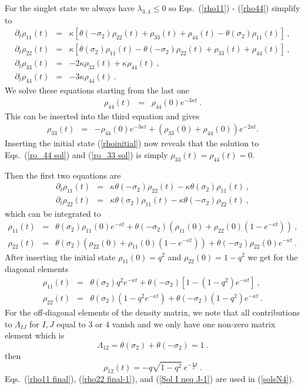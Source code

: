 \documentclass[12pt]{article}
\def\beqn{\begin{eqnarray}}
\def\eeqn{\end{eqnarray}}
\begin{document}
For the singlet state we always have $\lambda_{3,4}\le0$
so Eqs.\ (\ref{rho11}) - (\ref{rho44}) simplify to
\beqn
\partial_{t}\rho_{11}(t) &=&\kappa\left[\theta(-\sigma_{2})\rho_{22}(t)+\rho_{33}(t)+\rho_{44}(t)-\theta(\sigma_{2})\rho_{11}(t)\right]~, \\
\partial_{t}\rho_{22}(t) &=&\kappa\left[\theta(\sigma_{2})\rho_{11}(t)-\theta(-\sigma_{2})\rho_{22}(t)+\rho_{33}(t)+\rho_{44}(t)\right]~,\\
\partial_{t}\rho_{33}(t) &=& -2\kappa\rho_{33}(t)+\kappa\rho_{44}(t)~,\\
\partial_{t}\rho_{44}(t) &=& -3\kappa\rho_{44}(t)~.
\eeqn
We solve these equations starting from the last one 
\beqn
\rho_{44}(t) &=& \rho_{44}(0)e^{-3\kappa t}\label{ro_44 sol}~.
\eeqn
This can be inserted into the third equation and gives
\beqn
\rho_{33}(t) &=& -\rho_{44}(0)e^{-3\kappa t}+\left(\rho_{33}(0)+\rho_{44}(0)\right)e^{-2\kappa t}.\label{ro_33 sol}
\eeqn
Inserting the initial state (\ref{rhoinitial}) now reveals that the solution to Eqs.\ (\ref{ro_44 sol})
and (\ref{ro_33 sol}) is simply $\rho_{33}(t)=\rho_{44}(t)=0$.

Then the first two equations are
\beqn
\partial_{t}\rho_{11}(t) &=&\kappa\theta(-\sigma_{2})\rho_{22}(t)-\kappa\theta(\sigma_{2})\rho_{11}(t)~,\\
\partial_{t}\rho_{22}(t) &=&\kappa\theta(\sigma_{2})\rho_{11}(t)-\kappa\theta(-\sigma_{2})\rho_{22}(t)~,
\eeqn
which can be integrated to
\beqn
\rho_{11}(t) &=& \theta(\sigma_2) \rho_{11}(0)e^{-\kappa t} + \theta(-\sigma_2) \left( \rho_{11}(0)+\rho_{22}(0)\left(1-e^{-\kappa t}\right) \right)~,\\
\rho_{22}(t) &=& \theta(\sigma_2) \left( \rho_{22}(0)+\rho_{11}(0)\left(1-e^{-\kappa t}\right) \right) + \theta(-\sigma_2) \rho_{22}(0)e^{-\kappa t} ~.
\eeqn
After inserting the initial state $\rho_{11}(0)=q^{2}$ and $\rho_{22}(0)=1-q^{2}$
we get for the diagonal elements
\beqn
\rho_{11}(t) &=&\theta(\sigma_{2})q^{2}e^{-\kappa t}+\theta(-\sigma_{2})\left[1-(1-q^{2})e^{-\kappa t}\right]\label{rho11 final}~,\\
\rho_{22}(t) &=&\theta(\sigma_{2})\left(1-q^{2}e^{-\kappa t}\right)+ \theta(-\sigma_{2})\left(1-q^{2}\right)e^{-\kappa t}\label{rho22 final-1}~.
\eeqn
For the off-diagonal elements of the density matrix, we note that all contributions to $\Lambda_{IJ}$ for $I,J$ equal to $3$ or $4$ vanish and we only have one non-zero matrix element which is
\begin{equation}
\Lambda_{12}=\theta(\sigma_{2})+\theta(-\sigma_{2})=1~.
\end{equation}
then
\begin{equation}
\rho_{12}(t)=-q\sqrt{1-q^{2}}\,e^{-\frac{\kappa}{2}t}\label{Sol I neq J-1}~.
\end{equation}
Eqs.\ (\ref{rho11 final}), (\ref{rho22 final-1}), and (\ref{Sol I neq J-1}) are used in (\ref{solsN4}). 
\end{document}
